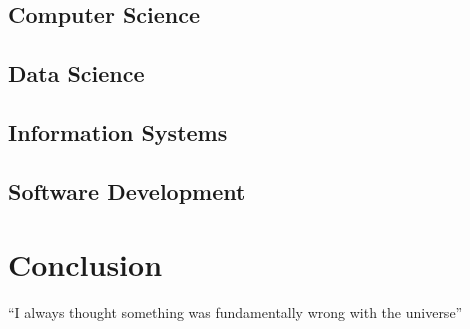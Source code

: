 \documentclass[12pt]{article}
\begin{document}
\subsection{Computer Science}


\subsection{Data Science}


\subsection{Information Systems}


\subsection{Software Development}

\section{Conclusion}
``I always thought something was fundamentally wrong with the universe\cite{Burridge_2018a}''
{}

% 
\end{document}

